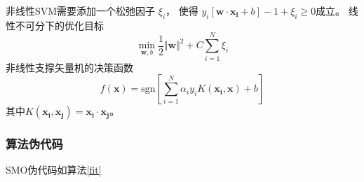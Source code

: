 \documentclass[cn,hazy,blue,14pt,normal]{elegantnote}
\newcommand{\sgn}{\text{sgn}}
\begin{document}
非线性SVM需要添加一个松弛因子 $\xi_i $，
使得 $y_i[\boldsymbol{w} \cdot\boldsymbol{x_i} + b] - 1 + \xi_i  \geq 0$成立。
线性不可分下的优化目标
\begin{equation}
    \label{usvm}
    \min_{ \boldsymbol{w},b} \frac{1}{2} \Vert  \boldsymbol{w} \Vert^2 +
    C\sum^N_{i = 1}\xi_i
\end{equation}
非线性支撑矢量机的决策函数
\begin{equation}
    f(\boldsymbol{x}) = \sgn[\sum^N_{i = 1}\alpha_i y_i
    K(\boldsymbol{x_i}, \boldsymbol{x}) + b]
\end{equation}
其中$K(\boldsymbol{x_i}, \boldsymbol{x_j})=\boldsymbol{x_i}\cdot \boldsymbol{x_j}$。

\subsubsection{算法伪代码}
SMO伪代码如算法\ref{fit}
\end{document}
